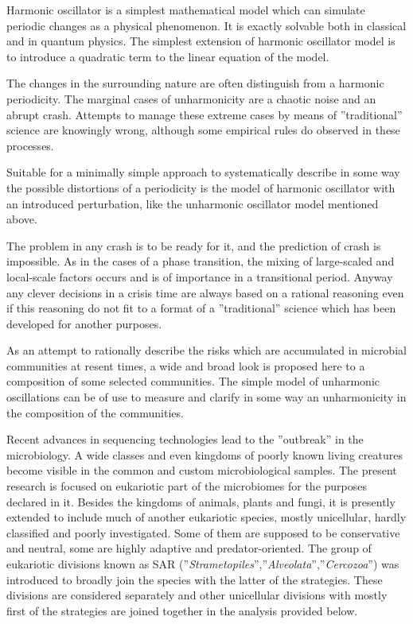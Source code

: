 \documentclass[a4paper]{article}
\begin{document}
Harmonic oscillator is a simplest mathematical model which can simulate periodic changes as a physical phenomenon. It is exactly solvable both in classical and in quantum physics. The simplest extension of harmonic oscillator model is to introduce a quadratic term to the linear equation of the model. 

The changes in the surrounding nature are often distinguish from a harmonic periodicity. The marginal cases of unharmonicity are a chaotic noise and an abrupt crash. Attempts to manage these extreme cases by means of ''traditional'' science are knowingly wrong, although some empirical rules do observed in these processes.

Suitable for a minimally simple approach to systematically describe in some way the possible distortions of a periodicity is the model of harmonic oscillator with an introduced perturbation, like the unharmonic oscillator model mentioned above. 

The problem in any crash is to be ready for it, and the prediction of crash is impossible. As in the cases of a phase transition, the mixing of large-scaled and local-scale factors occurs and is of importance in a transitional period. Anyway any clever decisions in a crisis time are always based on a rational reasoning even if this reasoning do not fit to a format of a ''traditional'' science which has been developed for another purposes.

As an attempt to rationally describe the risks which are accumulated in microbial communities at resent times, a wide and broad look is proposed here to a composition of some selected communities. The simple model of unharmonic oscillations can be of use to measure and clarify in some way an unharmonicity in the composition of the communities.

Recent advances in sequencing technologies lead to the ''outbreak'' in the microbiology. A wide classes and even kingdoms of poorly known living creatures become visible in the common and custom microbiological samples. The present research is focused on eukariotic part of the microbiomes for the purposes declared in it. Besides the kingdoms of animals, plants and fungi, it is presently extended to include much of another eukariotic species, mostly unicellular, hardly classified and poorly investigated. Some of them are supposed to be conservative and neutral, some are highly adaptive and predator-oriented. The group of eukariotic divisions known as SAR (''\textit{Strametopiles}'',''\textit{Alveolata}'',''\textit{Cercozoa}'') was introduced to broadly join the species with the latter of the strategies. These divisions are considered separately and other unicellular divisions with mostly first of the strategies are joined together in the analysis provided below.
\end{document}
